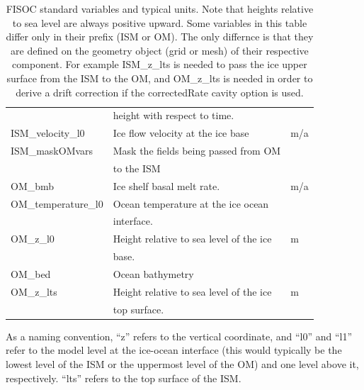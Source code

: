 \documentclass[11pt]{article}
\begin{document}
\begin{table}
\begin{center}
\begin{tabular}{ l|l|l }
                            & height with respect to time.                 &   \\
      ISM\_velocity\_l0     & Ice flow velocity at the ice base            & m/a \\
      ISM\_maskOMvars       & Mask the fields being passed from OM         &   \\
                            & to the ISM                                   &   \\
      OM\_bmb               & Ice shelf basal melt rate.                   & m/a \\
      OM\_temperature\_l0   & Ocean temperature at the ice ocean           &   \\
                            & interface.                                   &   \\
      OM\_z\_l0             & Height relative to sea level of the ice      & m \\
                            & base.                                        &   \\
      OM\_bed               & Ocean bathymetry                             &   \\
      OM\_z\_lts            & Height relative to sea level of the ice      & m \\
                            & top surface.                                 &   \\
    \end{tabular}
  \end{center}
  \caption{FISOC standard variables and typical units.  
    Note that heights relative to sea level are always positive upward.
    Some variables in this table differ only in their prefix (ISM or OM).
    The only differnce is that they are defined on the geometry object
    (grid or mesh)  of their respective component.
    For example ISM\_z\_lts is needed to pass the ice upper surface from the ISM
    to the OM, and OM\_z\_lts is needed in order to derive a drift correction if
    the correctedRate cavity option is used.
  }
  \label{tab:vars}
\end{table}



As a naming convention, ``z'' refers to the vertical coordinate, and ``l0'' and ``l1'' refer to the 
model level at the ice-ocean interface (this would typically be the lowest level of the ISM or 
the uppermost level of the OM) and one level above it, respectively. ``lts'' refers to the top 
surface of the ISM.
\end{document}
